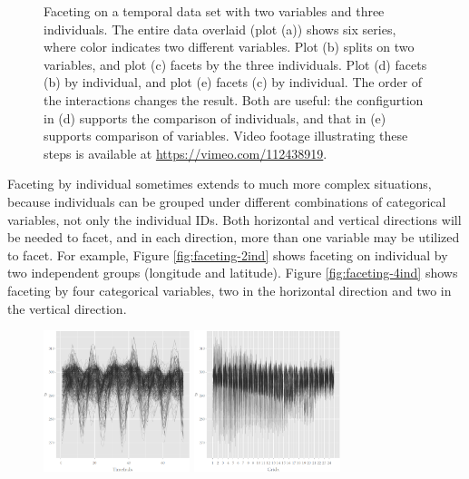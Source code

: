\documentclass[12pt]{article}
\begin{document}
\begin{itemize}
\begin{center}
\begin{figure}[htp]
\caption{\label{fig:faceting-var-ind}Faceting on a temporal data set with
two variables and three individuals. The entire data overlaid (plot (a)) shows six series, where color indicates two different variables. Plot (b) splits on two variables, and plot (c) facets by the three individuals. Plot (d) facets (b) by individual, and plot  (e) facets (c) by individual. The order of the interactions changes the result. Both are useful: the configurtion in (d) supports the comparison of individuals, and that in (e) supports comparison of variables.  Video footage illustrating these steps is available at \url{https://vimeo.com/112438919}.}
\end{figure}

\end{center}


Faceting by individual sometimes extends to much more complex situations,
because individuals can be grouped under different combinations of
categorical variables, not only the individual IDs. Both horizontal
and vertical directions will be needed to facet, and in each direction,
more than one variable may be utilized to facet. For example, Figure
\ref{fig:faceting-2ind} shows faceting on individual by two independent
groups  (longitude and latitude). Figure \ref{fig:faceting-4ind} shows
faceting by four categorical variables, two in the horizontal direction
and two in the vertical direction.


\begin{center}
\begin{figure}[htp]
\begin{centering}
\includegraphics[width=0.38\textwidth]{graph/pipeline-24-1} \includegraphics[width=0.38\textwidth]{graph/pipeline-24-3}
\end{centering}


\end{figure}
\end{center}
\end{itemize}
\end{document}
